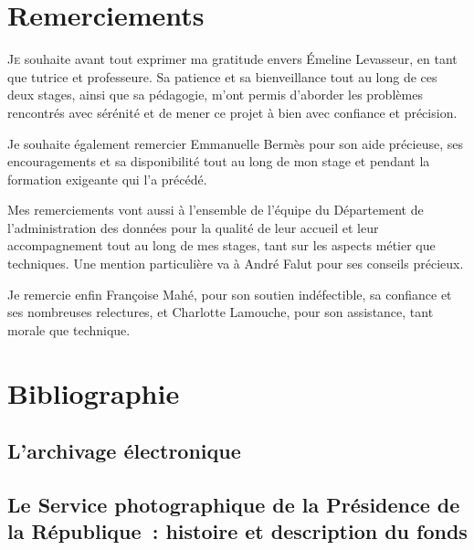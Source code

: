 \documentclass[a4paper,12pt,twoside]{book}
\begin{document}
\newpage{\pagestyle{empty}\cleardoublepage}
	
	\chapter*{Remerciements}
	
\lettrine{J}e souhaite avant tout exprimer ma gratitude envers Émeline Levasseur, en tant que tutrice et professeure. Sa patience et sa bienveillance tout au long de ces deux stages, ainsi que sa pédagogie, m'ont permis d'aborder les problèmes rencontrés avec sérénité et de mener ce projet à bien avec confiance et précision. 

Je souhaite également remercier Emmanuelle Bermès pour son aide précieuse, ses encouragements et sa disponibilité tout au long de mon stage et pendant la formation exigeante qui l'a précédé.

Mes remerciements vont aussi à l'ensemble de l'équipe du Département de l'administration des données pour la qualité de leur accueil et leur accompagnement tout au long de mes stages, tant sur les aspects métier que techniques. Une mention particulière va à André Falut pour ses conseils précieux.

Je remercie enfin Françoise Mahé, pour son soutien indéfectible, sa confiance et ses nombreuses relectures, et Charlotte Lamouche, pour son assistance, tant morale que technique.
\newpage{\pagestyle{empty}\cleardoublepage}
	
\chapter*{Bibliographie}
\section*{L'archivage électronique}
\printbibliography[heading=generalites, keyword=generalites]
\printbibliography[heading=archivage-e-a-aux-archives-nationales, keyword=archivage-e-a-aux-archives-nationales]
\printbibliography[heading=normes-description, keyword=normes-description]
\printbibliography[heading=cadre-juridique, keyword=cadre-juridique]
\printbibliography[heading=systemes-archivage, keyword=systemes-archivage]
\printbibliography[heading=outils-archivage, keyword=outils-archivage]
\printbibliography[heading=documentation-vitam, keyword=documentation-vitam]
\printbibliography[heading=archives-ia, keyword=archives-ia]
\section*{ Le Service photographique de la Présidence de la République : histoire et description du fonds}
\printbibliography[heading=instruments-recherche, keyword=instruments-recherche]
\printbibliography[heading=notices-producteur, keyword=notices-producteur]
\printbibliography[heading=sources-bibliographiques, keyword=sources-bibliographiques]
\printbibliography[heading=gestion-archives, keyword=gestion-archives]
\printbibliography[heading=traitements-caracteristiques, keyword=traitements-caracteristiques]
\printbibliography[heading=histoire-sociologie, keyword=histoire-sociologie]
\end{document}

